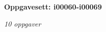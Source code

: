\centerline{\bf Oppgavesett: i00060-i00069}
\vskip 10pt
\centerline{\it 10 oppgaver}\vskip 10pt
\vskip 10pt

